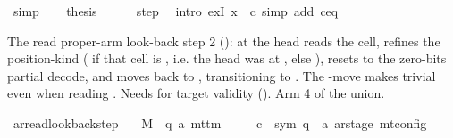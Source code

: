 \begin{isabellebody}
\ simp\isanewline
\ \ \isamarkupfalse%
\ {\isacharquery}{\kern0pt}thesis\isanewline
\ \ \ \ \isamarkupfalse%
\ step\ \isamarkupfalse%
\ {\isacharparenleft}{\kern0pt}intro\ exI{\isacharbrackleft}{\kern0pt}\ x\ {\isacharequal}{\kern0pt}\ {\isacharquery}{\kern0pt}c{\isacharprime}{\kern0pt}{\isacharprime}{\kern0pt}{\isacharbrackright}{\kern0pt}{\isacharparenright}{\kern0pt}\ {\isacharparenleft}{\kern0pt}simp\ add{\isacharcolon}{\kern0pt}\ c{\isacharprime}{\kern0pt}{\isacharunderscore}{\kern0pt}eq{\isacharparenright}{\kern0pt}\isanewline
{}\isamarkupfalse%
%
\endisatagproof
{\isafoldproof}%
%
\isadelimproof
%
\endisadelimproof
%
\begin{isamarkuptext}%
The read proper-arm look-back step 2 (): at
   the head reads the cell, refines the
  position-kind ( if that cell is ,
  i.e. the head was at , else ),
  resets  to the zero-bits partial decode, and moves
   back to , transitioning to .
  The -move makes  trivial even when reading
  .  Needs  for target validity
  ().  Arm 4 of the union.%
\end{isamarkuptext}\isamarkuptrue%
\isamarkupfalse%
\ ar{\isacharunderscore}{\kern0pt}read{\isacharunderscore}{\kern0pt}lookback{}{\isacharunderscore}{\kern0pt}step{\isacharcolon}{\kern0pt}\isanewline
\ \ \ M\ {\isacharcolon}{\kern0pt}{\isacharcolon}{\kern0pt}\ {\isachardoublequoteopen}{\isacharparenleft}{\kern0pt}{\isacharprime}{\kern0pt}q{\isacharcomma}{\kern0pt}\ {\isacharprime}{\kern0pt}a{\isacharparenright}{\kern0pt}\ mttm{\isachardoublequoteclose}\isanewline
\ \ \ \ \ c{\isacharprime}{\kern0pt}\ {\isacharcolon}{\kern0pt}{\isacharcolon}{\kern0pt}\ {\isachardoublequoteopen}{\isacharparenleft}{\kern0pt}sym{}{\isacharcomma}{\kern0pt}\ {\isacharprime}{\kern0pt}q\ {\isasymtimes}\ {\isacharprime}{\kern0pt}a\ ar{\isacharunderscore}{\kern0pt}stage{\isacharparenright}{\kern0pt}\ mt{\isacharunderscore}{\kern0pt}config{\isachardoublequoteclose}\isanewline

\end{isabellebody}
